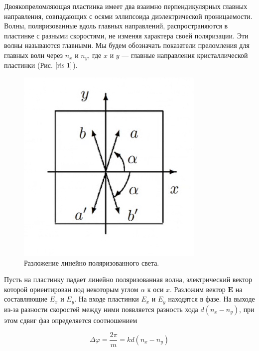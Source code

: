 \documentclass[a4paper, 12pt]{article}
\renewcommand{\phi}{\varphi}
\begin{document}
Двоякопреломляющая пластинка имеет два взаимно перпендикулярных главных направления, совпадающих с осями эллипсоида диэлектрической проницаемости. Волны, поляризованные вдоль главных направлений, распространяются в пластинке с разными скоростями, не изменяя характера своей поляризации. Эти волны называются главными. Мы будем обозначать показатели преломления для главных волн через $ n_x $ и $ n_y $, где $ x $ и $ y $ --- главные направления кристаллической пластинки (Рис. $\ref{ris 1}$).
\begin{figure}
	\includegraphics[width=\linewidth]{1.jpeg}
	\caption{Разложение линейно поляризованного света.}
	\label{ris 1}
\end{figure}


Пусть на пластинку падает линейно поляризованная волна, электрический вектор которой ориентирован под некоторым углом $ \alpha $ к оси
$ x $. Разложим вектор $ \mathbf{E} $ на составляющие $ E_x $ и $ E_y $. На входе пластинки $ E_x $ и $ E_y $ находятся в фазе. На выходе из-за разности скоростей между ними появляется разность хода $ d(n_x - n_y) $, при этом сдвиг фаз определяется соотношением

\begin{equation}\label{}
\Delta \phi =  \dfrac{2\pi}{m} = k d(n_x - n_y)
\end{equation}
\end{document}
